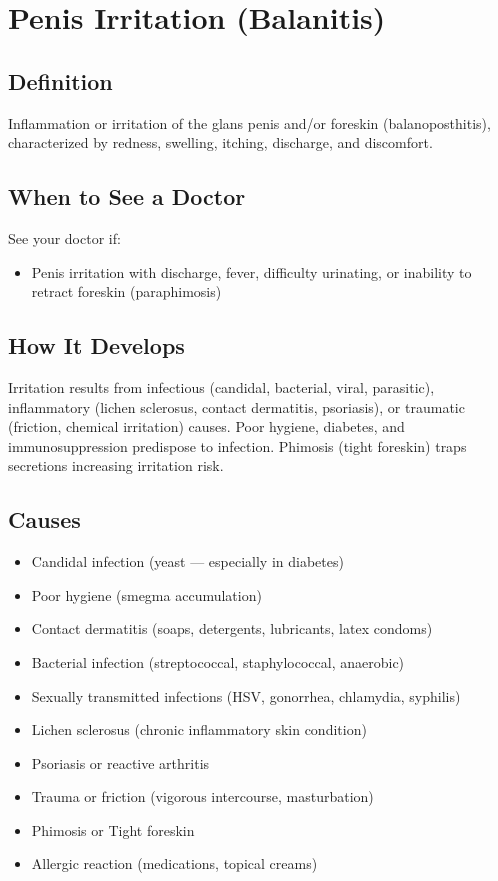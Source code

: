 \chapter{Penis Irritation (Balanitis)}

\section*{Definition}
Inflammation or irritation of the glans penis and/or foreskin (balanoposthitis), characterized by redness, swelling, itching, discharge, and discomfort.

\section*{When to See a Doctor}
See your doctor if:
\begin{itemize}
  \item Penis irritation with discharge, fever, difficulty urinating, or inability to retract foreskin (paraphimosis)
\end{itemize}

\section*{How It Develops}
Irritation results from infectious (candidal, bacterial, viral, parasitic), inflammatory (lichen sclerosus, contact dermatitis, psoriasis), or traumatic (friction, chemical irritation) causes. Poor hygiene, diabetes, and immunosuppression predispose to infection. Phimosis (tight foreskin) traps secretions increasing irritation risk.

\section*{Causes}
\begin{itemize}
  \item Candidal infection (yeast — especially in diabetes)
  \item Poor hygiene (smegma accumulation)
  \item Contact dermatitis (soaps, detergents, lubricants, latex condoms)
  \item Bacterial infection (streptococcal, staphylococcal, anaerobic)
  \item Sexually transmitted infections (HSV, gonorrhea, chlamydia, syphilis)
  \item Lichen sclerosus (chronic inflammatory skin condition)
  \item Psoriasis or reactive arthritis
  \item Trauma or friction (vigorous intercourse, masturbation)
  \item Phimosis or Tight foreskin
  \item Allergic reaction (medications, topical creams)
\end{itemize}


